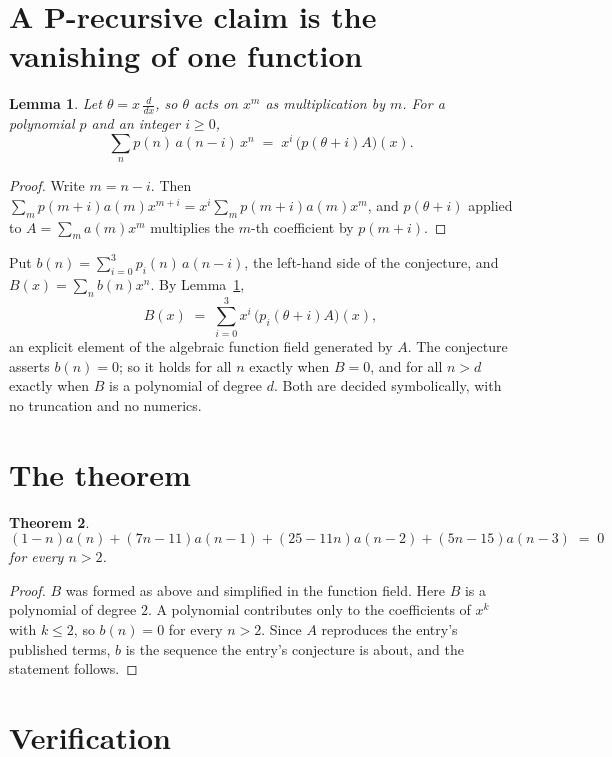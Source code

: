 \documentclass[11pt,a4paper]{article}
\theoremstyle{plain}
\newtheorem{theorem}{Theorem}
\newtheorem{lemma}[theorem]{Lemma}
\theoremstyle{definition}
\begin{document}
\section{A P-recursive claim is the vanishing of one function}

\begin{lemma}\label{lem:theta}
Let $\theta=x\,\frac{d}{dx}$, so $\theta$ acts on $x^m$ as multiplication by $m$. For a
polynomial $p$ and an integer $i\ge0$,
\[
\sum_{n} p(n)\,a(n-i)\,x^{n}\;=\;x^{i}\,\bigl(p(\theta+i)A\bigr)(x).
\]
\end{lemma}

\begin{proof}
Write $m=n-i$. Then $\sum_m p(m+i)a(m)x^{m+i}=x^i\sum_m p(m+i)a(m)x^m$, and $p(\theta+i)$
applied to $A=\sum_m a(m)x^m$ multiplies the $m$-th coefficient by $p(m+i)$.
\end{proof}

Put $b(n)=\sum_{i=0}^{3}p_i(n)\,a(n-i)$, the left-hand side of the conjecture, and
$B(x)=\sum_n b(n)x^n$. By Lemma~\ref{lem:theta},
\[
B(x)\;=\;\sum_{i=0}^{3}x^{i}\,\bigl(p_i(\theta+i)A\bigr)(x),
\]
an explicit element of the algebraic function field generated by $A$. The conjecture asserts
$b(n)=0$; so it holds for all $n$ exactly when $B=0$, and for all $n>d$ exactly when $B$ is a
polynomial of degree $d$. Both are decided symbolically, with no truncation and no numerics.

\section{The theorem}

\begin{theorem}
\[
\left(1 - n\right)a(n) + \left(7 n - 11\right)a(n-1) + \left(25 - 11 n\right)a(n-2) + \left(5 n - 15\right)a(n-3)\;=\;0
\]
for every $n>2$.
\end{theorem}

\begin{proof}
$B$ was formed as above and simplified in the function field. Here $B$ is a polynomial of degree $2$. A polynomial contributes only to the coefficients of $x^k$ with $k\le2$, so $b(n)=0$ for every $n>2$. Since $A$ reproduces the
entry's published terms, $b$ is the sequence the entry's conjecture is about, and the statement
follows.
\end{proof}

\section{Verification}
\end{document}
